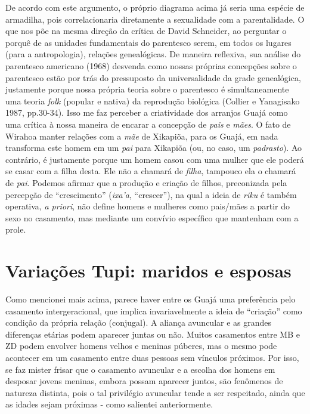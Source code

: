 De acordo com este argumento, o próprio diagrama acima já seria uma
espécie de armadilha, pois correlacionaria diretamente a sexualidade com
a parentalidade. O que nos põe na mesma direção da crítica de David
Schneider, ao perguntar o porquê de as unidades fundamentais do
parentesco serem, em todos os lugares (para a antropologia), relações
genealógicas. De maneira reflexiva, sua análise do parentesco americano
(1968) desvenda como nossas próprias concepções sobre o parentesco estão
por trás do pressuposto da universalidade da grade genealógica,
justamente porque nossa própria teoria sobre o parentesco é
simultaneamente uma teoria \emph{folk} (popular e nativa) da reprodução
biológica (Collier e Yanagisako 1987, pp.30-34). Isso me faz perceber a
criatividade dos arranjos Guajá como uma crítica à nossa maneira de
encarar a concepção de \emph{pais} e \emph{mães}. O fato de Wirahoa
manter relações com a \emph{mãe} de Xikapiõa, para os Guajá, em nada
transforma este homem em um \emph{pai} para Xikapiõa (ou, no caso, um
\emph{padrasto}). Ao contrário, é justamente porque um homem casou com
uma mulher que ele poderá se casar com a filha desta. Ele não a chamará
de \emph{filha}, tampouco ela o chamará de \emph{pai}. Podemos afirmar
que a produção e criação de filhos, preconizada pela percepção de
``crescimento'' (\emph{ixa'a}, ``crescer''), na qual a ideia de
\emph{riku} é também operativa, \emph{a priori}, não define homens e
mulheres como pais/mães a partir do sexo no casamento, mas mediante um
convívio específico que mantenham com a prole.

\section{Variações Tupi: maridos e esposas}\label{variauxe7uxf5es-tupi-maridos-e-esposas}

Como mencionei mais acima, parece haver entre os Guajá uma preferência
pelo casamento intergeracional, que implica invariavelmente a ideia de
``criação'' como condição da própria relação (conjugal). A aliança
avuncular e as grandes diferenças etárias podem aparecer juntas ou não.
Muitos casamentos entre MB e ZD podem envolver homens velhos e meninas
púberes, mas o mesmo pode acontecer em um casamento entre duas pessoas
sem vínculos próximos. Por isso, se faz mister frisar que o casamento
avuncular e a escolha dos homens em desposar jovens meninas, embora
possam aparecer juntos, são fenômenos de natureza distinta, pois o tal
privilégio avuncular tende a ser respeitado, ainda que as idades sejam
próximas - como salientei anteriormente.

